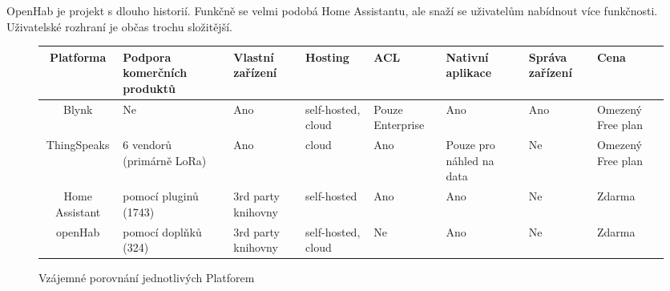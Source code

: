 OpenHab je projekt s dlouho historií. Funkčně se velmi podobá Home Assistantu, ale snaží se uživatelům nabídnout více funkčnosti. Uživatelské rozhraní je občas trochu složitější.
\begin{sidewaysfigure}
    \centering
    \begin{tabular}{ |c| m{5em}| m{5em}|m{5em}|m{4em}| m{5em}| m{4em}| m{4em}| }
        \hline
        Platforma      & Podpora komerčních produktů & Vlastní zařízení   & Hosting            & ACL              & Nativní aplikace         & Správa zařízení & Cena              \\
        \hline
        Blynk          & Ne                          & Ano                & self-hosted, cloud & Pouze Enterprise & Ano                      & Ano             & Omezený Free plan \\
        \hline
        ThingSpeaks    & 6 vendorů (primárně LoRa)   & Ano                & cloud              & Ano              & Pouze pro náhled na data & Ne              & Omezený Free plan \\
        \hline
        Home Assistant & pomocí pluginů (1743)       & 3rd party knihovny & self-hosted        & Ano              & Ano                      & Ne              & Zdarma            \\
        \hline
        openHab        & pomocí doplňků (324)        & 3rd party knihovny & self-hosted, cloud & Ne               & Ano                      & Ne              & Zdarma            \\
        \hline
    \end{tabular}
    \caption{Vzájemné porovnání jednotlivých Platforem}
\end{sidewaysfigure}

